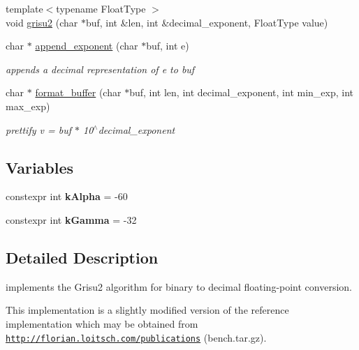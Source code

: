 \begin{DoxyCompactItemize}
\item 
{\footnotesize template$<$typename Float\+Type $>$ }\\void \hyperlink{namespacenlohmann_1_1detail_1_1dtoa__impl_aab7a9670a4f4704a5d0347ad7588576b}{grisu2} (char $\ast$buf, int \&len, int \&decimal\+\_\+exponent, Float\+Type value)
\item 
char $\ast$ \hyperlink{namespacenlohmann_1_1detail_1_1dtoa__impl_a84733638b826eda624488f5fa4521e0b}{append\+\_\+exponent} (char $\ast$buf, int e)
\begin{DoxyCompactList}\small\item\em appends a decimal representation of e to buf \end{DoxyCompactList}\item 
char $\ast$ \hyperlink{namespacenlohmann_1_1detail_1_1dtoa__impl_a12c1c5d8b46ba9702186445e73f86afe}{format\+\_\+buffer} (char $\ast$buf, int len, int decimal\+\_\+exponent, int min\+\_\+exp, int max\+\_\+exp)
\begin{DoxyCompactList}\small\item\em prettify v = buf $\ast$ 10$^\wedge$decimal\+\_\+exponent \end{DoxyCompactList}\end{DoxyCompactItemize}
\subsection*{Variables}
\begin{DoxyCompactItemize}
\item 
\mbox{\label{namespacenlohmann_1_1detail_1_1dtoa__impl_ac1ea1316de0b4a219f707c76b1db1966}} 
constexpr int {\bfseries k\+Alpha} = -\/60
\item 
\mbox{\label{namespacenlohmann_1_1detail_1_1dtoa__impl_a4a750fcc38da1ce68b7e25ab3a230e20}} 
constexpr int {\bfseries k\+Gamma} = -\/32
\end{DoxyCompactItemize}


\subsection{Detailed Description}
implements the Grisu2 algorithm for binary to decimal floating-\/point conversion. 

This implementation is a slightly modified version of the reference implementation which may be obtained from \href{http://florian.loitsch.com/publications}{\tt http\+://florian.\+loitsch.\+com/publications} (bench.\+tar.\+gz).

